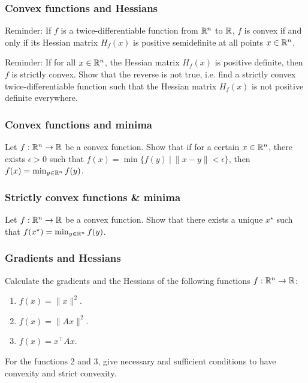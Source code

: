 \documentclass{beamer}
\begin{document}
\begin{frame}[t]
\frametitle{Convex functions and Hessians}
\vspace{-5pt}
Reminder: If $f$ is a twice-differentiable function from $\mathbb{R}^n$ to $\mathbb{R}$, $f$ is convex if and only if its Hessian matrix $H_f(x)$ is positive semidefinite at all points $x \in \mathbb{R}^n$.

Reminder: If for all $x \in \mathbb{R}^n$, the Hessian matrix $H_f(x)$ is positive definite, then $f$ is strictly convex. Show that the reverse is not true, i.e. find a strictly convex twice-differentiable function such that the Hessian matrix $H_f(x)$ is not positive definite everywhere.
\pause
\pause
\end{frame}

\begin{frame}[t]
\frametitle{Convex functions and minima}
Let $f : \mathbb{R}^n \rightarrow \mathbb{R}$ be a convex function. Show that if for a certain $x \in \mathbb{R}^n$, there exists $\epsilon > 0$ such that $f(x) = \min \{f(y) \ | \ \|x-y\| < \epsilon \}$, then $f(x) = \min_{y \in \mathbb{R}^n} f(y)$.
\pause
\end{frame}

\begin{frame}[t]
\frametitle{Strictly convex functions \& minima}
Let $f : \mathbb{R}^n \rightarrow \mathbb{R}$ be a convex function. Show that there exists a unique $x^{\star}$ such that $f(x^{\star}) = \min_{y \in \mathbb{R}^n} f(y)$.
\pause
\end{frame}

\begin{frame}[t]
\frametitle{Gradients and Hessians}
\vspace{-10pt}
Calculate the gradients and the Hessians of the following functions $f : \mathbb{R}^n \rightarrow \mathbb{R}$:
\begin{enumerate}
\item $f(x) = \|x\|^2$.
\item $f(x) = \|Ax\|^2$.
\item $f(x) = x^\top A x$.
\end{enumerate}
For the functions 2 and 3, give necessary and sufficient conditions to have convexity and strict convexity.
\pause
\pause
\pause
\end{frame}

\begin{frame}[t]
\pause
\pause
\pause
\end{frame}
\end{document}
